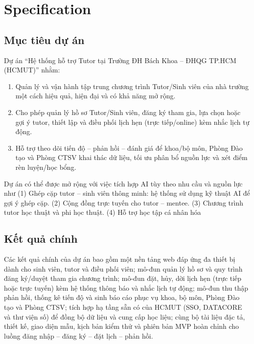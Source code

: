 \documentclass[12pt, a4paper, oneside]{report}
\begin{document}
\chapter{Specification}
\begin{spacing}{1.5}
\section{Mục tiêu dự án}
\hspace{0.5cm}Dự án “Hệ thống hỗ trợ Tutor tại Trường ĐH Bách Khoa – ĐHQG TP.HCM (HCMUT)” nhằm:
\begin{enumerate}
    \item Quản lý và vận hành tập trung chương trình Tutor/Sinh viên của nhà trường một cách hiệu quả, hiện đại và có khả năng mở rộng.
    \item Cho phép quản lý hồ sơ Tutor/Sinh viên, đăng ký tham gia, lựa chọn hoặc gợi ý tutor, thiết lập và điều phối lịch hẹn (trực tiếp/online) kèm nhắc lịch tự động.
    \item Hỗ trợ theo dõi tiến độ – phản hồi – đánh giá để khoa/bộ môn, Phòng Đào tạo và Phòng CTSV khai thác dữ liệu, tối ưu phân bổ nguồn lực và xét điểm rèn luyện/học bổng.
\end{enumerate}
\hspace{0.5cm}Dự án có thể được mở rộng với việc tích hợp AI tùy theo nhu cầu và nguồn lực như (1) Ghép cặp tutor – sinh viên thông minh: hệ thống sử dụng kỹ thuật AI để gợi ý ghép cặp. (2) Cộng đồng trực tuyến cho tutor – mentee. (3) Chương trình tutor học thuật và phi học thuật.  (4) Hỗ trợ học tập cá nhân hóa

\section{Kết quả chính}
\hspace{0.5cm}Các kết quả chính của dự án bao gồm một nền tảng web đáp ứng đa thiết bị dành cho sinh viên, tutor và điều phối viên; mô-đun quản lý hồ sơ và quy trình đăng ký/duyệt tham gia chương trình; mô-đun đặt, hủy, dời lịch hẹn (trực tiếp hoặc trực tuyến) kèm hệ thống thông báo và nhắc lịch tự động; mô-đun thu thập phản hồi, thống kê tiến độ và sinh báo cáo phục vụ khoa, bộ môn, Phòng Đào tạo và Phòng CTSV; tích hợp hạ tầng sẵn có của HCMUT (SSO, DATACORE và thư viện số) để đồng bộ dữ liệu và cung cấp học liệu; cùng bộ tài liệu đặc tả, thiết kế, giao diện mẫu, kịch bản kiểm thử và phiên bản MVP hoàn chỉnh cho luồng đăng nhập – đăng ký – đặt lịch – phản hồi.


\end{spacing}
\end{document}
